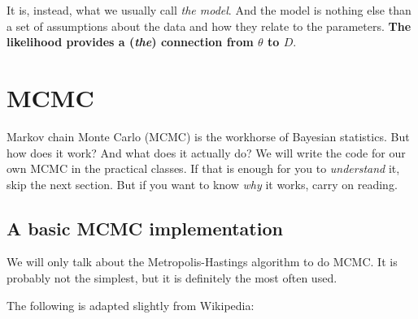 \documentclass[a4paper,11pt]{article}
\begin{document}
It is, instead, what we usually call \emph{the model}.
And the model is nothing else than a set of assumptions about the data and how they relate to the parameters.
\textbf{The likelihood provides a (\emph{the}) connection from $\theta$ to $D$}.





\section{MCMC}

Markov chain Monte Carlo (MCMC) is the workhorse of Bayesian statistics.
But how does it work? 
And what does it actually do?
We will write the code for our own MCMC in the practical classes.
If that is enough for you to \emph{understand} it, skip the next section.
But if you want to know \emph{why} it works, carry on reading.


\subsection{A basic MCMC implementation}

We will only talk about the Metropolis-Hastings algorithm to do MCMC.
It is probably not the simplest, but it is definitely the most often used.

\noindent The following is adapted slightly from Wikipedia:
\end{document}
